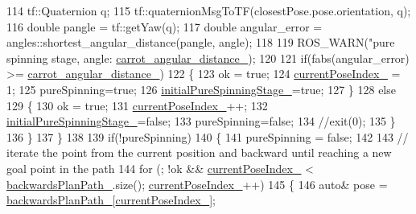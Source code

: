 \begin{DoxyCode}
114             tf::Quaternion q;
115             tf::quaternionMsgToTF(closestPose.pose.orientation, q);
116             \textcolor{keywordtype}{double} pangle = tf::getYaw(q);
117             \textcolor{keywordtype}{double} angular\_error = angles::shortest\_angular\_distance(pangle, angle);
118 
119             ROS\_WARN(\textcolor{stringliteral}{"pure spinning stage, angle: %
      \hyperlink{classbackward__local__planner_1_1BackwardLocalPlanner_adcfcc43316a79db09f6c09b8e2a482b6}{carrot\_angular\_distance\_});
120 
121             \textcolor{keywordflow}{if}(fabs(angular\_error) >= \hyperlink{classbackward__local__planner_1_1BackwardLocalPlanner_adcfcc43316a79db09f6c09b8e2a482b6}{carrot\_angular\_distance\_})
122             \{
123                 ok = \textcolor{keyword}{true};
124                 \hyperlink{classbackward__local__planner_1_1BackwardLocalPlanner_af2485562720c0ce3c895debdbdfc89f3}{currentPoseIndex\_} = 1;
125                 pureSpinning=\textcolor{keyword}{true};
126                 \hyperlink{classbackward__local__planner_1_1BackwardLocalPlanner_ae03594253808527b547901baa5480d41}{initialPureSpinningStage\_}=\textcolor{keyword}{true};
127             \}
128             \textcolor{keywordflow}{else}
129             \{
130                 ok = \textcolor{keyword}{true};
131                 \hyperlink{classbackward__local__planner_1_1BackwardLocalPlanner_af2485562720c0ce3c895debdbdfc89f3}{currentPoseIndex\_}++;
132                 \hyperlink{classbackward__local__planner_1_1BackwardLocalPlanner_ae03594253808527b547901baa5480d41}{initialPureSpinningStage\_}=\textcolor{keyword}{false};
133                 pureSpinning=\textcolor{keyword}{false};
134                 \textcolor{comment}{//exit(0);}
135             \}
136         \}
137     \}
138     
139     \textcolor{keywordflow}{if}(!pureSpinning)
140     \{
141         pureSpinning  = \textcolor{keyword}{false};
142 
143         \textcolor{comment}{// iterate the point from the current position and backward until reaching a new goal point in the
       path}
144         \textcolor{keywordflow}{for} (; !ok && \hyperlink{classbackward__local__planner_1_1BackwardLocalPlanner_af2485562720c0ce3c895debdbdfc89f3}{currentPoseIndex\_} < \hyperlink{classbackward__local__planner_1_1BackwardLocalPlanner_aaa37c16e1735cb440986b3d41e6ef8e6}{backwardsPlanPath\_}.size(); 
      \hyperlink{classbackward__local__planner_1_1BackwardLocalPlanner_af2485562720c0ce3c895debdbdfc89f3}{currentPoseIndex\_}++) 
145         \{
146             \textcolor{keyword}{auto}& pose = \hyperlink{classbackward__local__planner_1_1BackwardLocalPlanner_aaa37c16e1735cb440986b3d41e6ef8e6}{backwardsPlanPath\_}[\hyperlink{classbackward__local__planner_1_1BackwardLocalPlanner_af2485562720c0ce3c895debdbdfc89f3}{currentPoseIndex\_}];
}
\end{DoxyCode}
